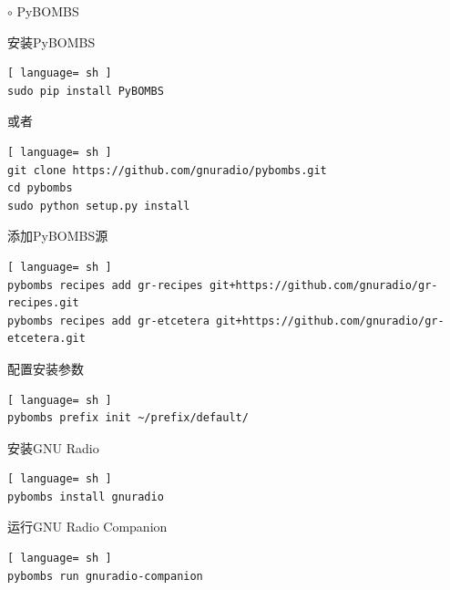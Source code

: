 			\par\noindent \qquad$\circ$ PyBOMBS
			\par 安装PyBOMBS
			\begin{lstlisting}[ language= sh ]
sudo pip install PyBOMBS
			\end{lstlisting}
			\par 或者
			\begin{lstlisting}[ language= sh ]
git clone https://github.com/gnuradio/pybombs.git
cd pybombs
sudo python setup.py install
			\end{lstlisting}
			\par 添加PyBOMBS源
			\begin{lstlisting}[ language= sh ]
pybombs recipes add gr-recipes git+https://github.com/gnuradio/gr-recipes.git  
pybombs recipes add gr-etcetera git+https://github.com/gnuradio/gr-etcetera.git
			\end{lstlisting}
			\par 配置安装参数
			\begin{lstlisting}[ language= sh ]
pybombs prefix init ~/prefix/default/
			\end{lstlisting}
			\par 安装GNU Radio
			\begin{lstlisting}[ language= sh ]
pybombs install gnuradio
			\end{lstlisting}
			\par 运行GNU Radio Companion
			\begin{lstlisting}[ language= sh ]
pybombs run gnuradio-companion
			\end{lstlisting}
